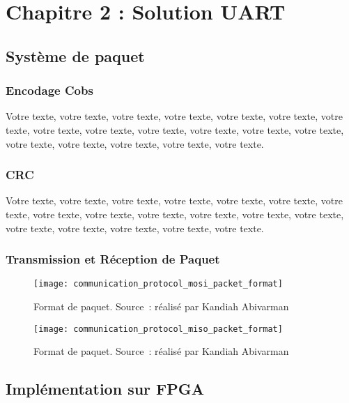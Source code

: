 \chapter{Chapitre 2 : Solution UART}

\section{Système de paquet}

\subsection{Encodage Cobs}

Votre texte, votre texte, votre texte, votre texte, votre texte, votre texte, votre texte, votre texte, votre texte, votre texte, votre texte, votre texte, votre texte, votre texte, votre texte, votre texte, votre texte, votre texte.

\subsection{CRC}

Votre texte, votre texte, votre texte, votre texte, votre texte, votre texte, votre texte, votre texte, votre texte, votre texte, votre texte, votre texte, votre texte, votre texte, votre texte, votre texte, votre texte, votre texte.

\subsection{Transmission et Réception de Paquet}

\begin{figure}[tbph!]
	\centering
	\texttt{[image: communication\_protocol\_mosi\_packet\_format]}
	\caption[Format de paquet - MOSI]{Format de paquet. Source : réalisé par Kandiah Abivarman}
	\label{fig:mosi_packet_format}
\end{figure}

\newpage

\begin{figure}[tbph!]
	\centering
	\texttt{[image: communication\_protocol\_miso\_packet\_format]}
	\caption[Format de paquet - MISO]{Format de paquet. Source : réalisé par Kandiah Abivarman}
	\label{fig:miso_packet_format}
\end{figure}

\newpage

\section{Implémentation sur FPGA}

